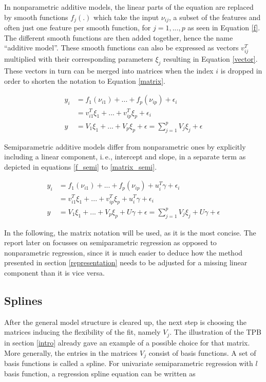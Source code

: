 \documentclass[12pt]{article}
\begin{document}
In nonparametric additive models, the linear parts of the equation are replaced by smooth functions $f_j(.)$ which take the input $\nu_{ij}$, a subset of the features and often just one feature per smooth function, for $j = 1,...,p$ as seen in Equation \ref{f}. 
The different smooth functions are then added together, hence the name ``additive model''.
These smooth functions can also be expressed as vectors $v^T_{ij}$  multiplied with their corresponding parameters $\xi_j$ resulting in Equation \ref{vector}. These vectors in turn can be merged into matrices when the index $i$ is dropped in order to shorten the notation to Equation   \ref{matrix}.

\begin{align}
y_i &= f_1(\nu_{i1}) + ... + f_p(\nu_{ip})+\epsilon_i \label{f}\\
&=  v^T_{i1}\xi_1 + ... + v^T_{ip}\xi_p+\epsilon_i \label{vector} \\
y &= V_1\xi_1 + ... + V_p\xi_p +\epsilon= \sum_{j=1}^p V_j\xi_j +\epsilon \label{matrix}
\end{align}

Semiparametric additive models differ from nonparametric ones by explicitly including a linear component, i.\,e., intercept and slope, in a separate term as depicted in equations \ref{f_semi} to \ref{matrix_semi}.

\begin{align}
y_i &= f_1(\nu_{i1}) + ... + f_p(\nu_{ip})+ u^T_i\gamma+\epsilon_i\label{f_semi}\\
&=  v^T_{i1}\xi_1 + ... + v^T_{ip}\xi_p+ u^T_i\gamma+\epsilon_i\label{vector_semi} \\
y&= V_1\xi_1 + ... + V_p\xi_p + U\gamma +\epsilon= \sum_{j=1}^p V_j\xi_j + U\gamma+\epsilon\label{matrix_semi}
\end{align}

In the following, the matrix notation will be used, as it is the most concise.
The report later on focusses on semiparametric regression as opposed to nonparametric regression, since it is much easier to deduce how the method presented in section \ref{representation} needs to be adjusted for a missing linear component than it is vice versa.

\subsection{Splines}



After the general model structure is cleared up, the next step is choosing the matrices inducing the flexibility of the fit, namely $V_j$.
The illustration of the TPB in section \ref{intro} already gave an example of a possible choice for that matrix. More generally, the entries in the matrices $V_j$ consist of basis functions. A set of basis functions is called a spline. For univariate semiparametric regression with $l$ basis function, a regression spline equation can be written as   
\end{document}
